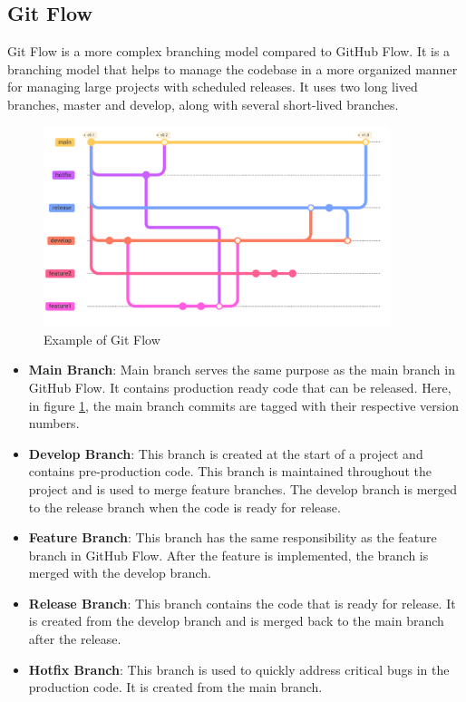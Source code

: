 \subsection{Git Flow}
Git Flow is a more complex branching model compared to GitHub Flow. It is a branching model that helps to manage the codebase in a more organized manner for
managing large projects with scheduled releases. It uses two long lived branches, master and develop, along with several short-lived branches.
\begin{figure}[!ht]
    \centering
    \includegraphics[width=0.9\textwidth]{Images/git_flow.pdf}
    \caption{Example of Git Flow}
    \label{git_flow}
\end{figure}
 \begin{itemize}
    \item \textbf{Main Branch}:\newline
    Main branch serves the same purpose as the main branch in GitHub Flow. It contains production ready code that can be released. Here, in figure \ref{git_flow},
    the main branch commits are tagged with their respective version numbers.

    \item \textbf{Develop Branch}:\newline
    This branch is created at the start of a project and contains pre-production code. This branch is maintained throughout the project and is used to merge 
    feature branches. The develop branch is merged to the release branch when the code is ready for release.

    \item \textbf{Feature Branch}:\newline
    This branch has the same responsibility as the feature branch in GitHub Flow. After the feature is implemented, the branch is merged with the develop branch.
 
    \item \textbf{Release Branch}:\newline
    This branch contains the code that is ready for release. It is created from the develop branch and is merged back to the main branch after the release.

    \item \textbf{Hotfix Branch}:\newline
    This branch is used to quickly address critical bugs in the production code. It is created from the main branch.
\end{itemize}

